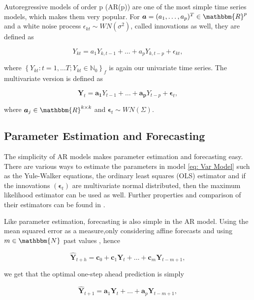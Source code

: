 Autoregressive models of order p (AR(p))  are one of the most simple time series models, which makes them very popular. For $\bm{a}=(a_1,\ldots,a_p)^T \in \mathbbm{R}^p$ and a white noise process $\epsilon_{kt} \sim WN(\sigma^2)$, called innovations as well, they are defined as 

\begin{equation}
Y_{kt} = a_1Y_{k,t-1} + \ldots + a_pY_{k,t-p} + \epsilon_{kt},
\label{eq: Ar model}
\end{equation}

where $\left\{Y_{kt}:t=1,\ldots T; Y_{kt} \in \mathbb{N}_0\right\}_f$ is again our univariate time series. The multivariate version is defined as 

\begin{equation}
\bm{Y}_{t} = \bm{a_1}Y_{t-1} + \ldots + \bm{a_p}Y_{t-p} + \bm{\epsilon}_{t},
\label{eq: Var Model}
\end{equation}

where $\bm{a}_j \in \mathbbm{R}^{k \times k}$ and $\bm{\epsilon}_t \sim WN(\Sigma)$.%

\subsection{Parameter Estimation and Forecasting}
\label{sec: AR Estimation and Forecasting}

The simplicity of AR models makes parameter estimation and forecasting easy. There are various ways to estimate the parameters in model \ref{eq: Var Model} such as the Yule-Walker equations, the ordinary least squares (OLS) estimator and if the innovations $(\bm{\epsilon}_t)$ are multivariate normal distributed, then the maximum likelihood estimator can be used as well. Further properties and comparison of their estimators can be found in \cite{Scherrer:2021}. 

Like parameter estimation, forecasting is also simple in the AR model. Using the mean squared error as a measure,only considering affine forecasts and using $m \in \mathbbm{N}$ past values , hence 

\begin{equation}
\hat{\bm{Y}}_{t+h} = \bm{c}_0 + \bm{c}_1\bm{Y}_{t} + \ldots + \bm{c}_m\bm{Y}_{t-m+1},
\label{eq:Forecasting general}
\end{equation}

we get that the optimal one-step ahead prediction is simply 

\begin{equation}
\hat{\bm{Y}}_{t+1} = \bm{a}_1\bm{Y}_{t} + \ldots + \bm{a}_p\bm{Y}_{t-m+1},
\label{eq:AR 1step Forecasting}
\end{equation}

